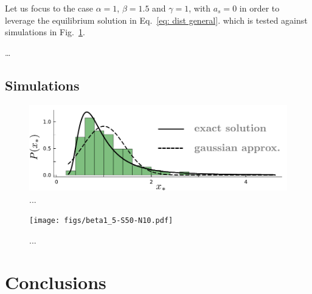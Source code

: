 \documentclass[%
 reprint,
 amsmath,amssymb,
 aps,
]{revtex4-2}
\begin{document}
Let us focus to the case $\alpha=1$, $\beta=1.5$ and $\gamma=1$, with
$a_s=0$ in order to leverage the equilibrium solution in Eq.~\eqref{eq: dist general}.
which is tested against simulations in Fig.~\ref{fig: cavity sol.}.

\dots

\subsection{Simulations}

\begin{figure}[h!]
    \centering
    \includegraphics[width=.45\textwidth]{figs/cavity.pdf}
        \caption{...}
        \label{fig: cavity sol.}
    \end{figure}

\begin{figure}[h!]
\centering
\texttt{[image: figs/beta1\_5-S50-N10.pdf]}
    \caption{...}
    \label{fig: stability line + sims}
\end{figure}

\section{Conclusions}
\end{document}

